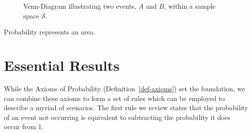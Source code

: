 \documentclass[
  letterpaper,
  DIV=11,
  numbers=noendperiod]{scrreprt}
\theoremstyle{definition}
\theoremstyle{plain}
\theoremstyle{definition}
\theoremstyle{remark}
\begin{document}
\begin{figure}


\caption{\label{fig-fundamentals-venn-diagram}Venn-Diagram illustrating
two events, \(A\) and \(B\), within a sample space \(\mathcal{S}\).}

\end{figure}%

\begin{tcolorbox}[enhanced jigsaw, breakable, colframe=quarto-callout-tip-color-frame, titlerule=0mm, arc=.35mm, coltitle=black, opacitybacktitle=0.6, leftrule=.75mm, opacityback=0, left=2mm, toprule=.15mm, colbacktitle=quarto-callout-tip-color!10!white, title=\textcolor{quarto-callout-tip-color}{\faLightbulb}\hspace{0.5em}{Big Idea}, bottomtitle=1mm, toptitle=1mm, rightrule=.15mm, bottomrule=.15mm, colback=white]

Probability represents an area.

\end{tcolorbox}

\section{Essential Results}\label{essential-results}

While the Axioms of Probability (Definition~\ref{def-axioms}) set the
foundation, we can combine these axioms to form a set of rules which can
be employed to describe a myriad of scenarios. The first rule we review
states that the probability of an event not occurring is equivalent to
subtracting the probability it does occur from 1.
\end{document}
